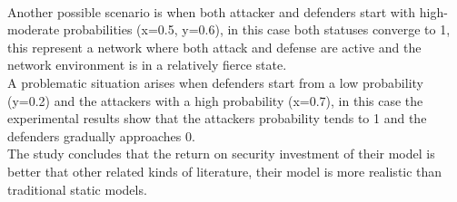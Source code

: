 \\Another possible scenario is when both attacker and defenders start with high-moderate probabilities (x=0.5, y=0.6), in this case both statuses converge to 1, this represent a network where both attack and defense are active and the network environment is in a relatively fierce state.
\\A problematic situation arises when defenders start from a low probability (y=0.2) and the attackers with a high probability (x=0.7), in this case the experimental results show that the attackers probability tends to 1 and the defenders gradually approaches 0.
\\The study concludes that the return on security investment of their model is better that other related kinds of literature, their model is more realistic than traditional static models.

